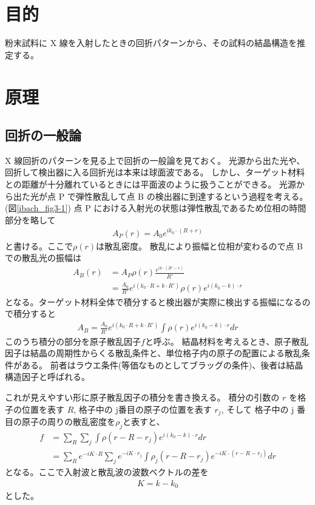 \documentclass[11pt,dvipdfmx,a4paper]{jsarticle}
\begin{document}
\section{目的}
粉末試料に X 線を入射したときの回折パターンから、その試料の結晶構造を推定する。

\section{原理}
\subsection{回折の一般論}
X 線回折のパターンを見る上で回折の一般論を見ておく。
光源から出た光や、回折して検出器に入る回折光は本来は球面波である。
しかし、ターゲット材料との距離が十分離れているときには平面波のように扱うことができる。
光源から出た光が点 P で弾性散乱して点 B の検出器に到達するという過程を考える。(図\ref{ibach_fig3-1})
点 P における入射光の状態は弾性散乱であるため位相の時間部分を略して
\begin{align}
	A_P(r) = A_0e^{ik_0\cdot(R+r)}
\end{align}
と書ける。ここで\(\rho(r)\)は散乱密度。
散乱により振幅と位相が変わるので点 B での散乱光の振幅は
\begin{align}
	A_B(r) &= A_P \rho(r) \frac{e^{ik\cdot(R'-r)}}{R'}\\
	&=\frac{A_0}{R'}e^{i(k_0 \cdot R+ k \cdot R')}\rho(r)e^{i(k_0-k)\cdot r}
\end{align}
となる。ターゲット材料全体で積分すると検出器が実際に検出する振幅になるので積分すると
\begin{align}
	A_B =\frac{A_0}{R'}e^{i(k_0 \cdot R+ k \cdot R')}\int \rho(r) e^{i(k_0-k)\cdot r} dr
\end{align}
このうち積分の部分を原子散乱因子\(f\)と呼ぶ。
結晶材料を考えるとき、原子散乱因子は結晶の周期性からくる散乱条件と、単位格子内の原子の配置による散乱条件がある。
前者はラウエ条件(等価なものとしてブラッグの条件)、後者は結晶構造因子と呼ばれる。

これが見えやすい形に原子散乱因子の積分を書き換える。
積分の引数の \(r\) を格子の位置を表す \(R\), 格子中の j番目の原子の位置を表す \(r_j\), そして
格子中の j 番目の原子の周りの散乱密度を\(\rho_j\)と表すと、
\begin{align}
	f&=\sum_R \sum_{j} \int\rho(r-R-r_j)e^{i(k_0-k)\cdot r} dr\\
	&=\sum_R e^{-iK\cdot R}\sum_j e^{-iK\cdot r_j} \int \rho_j(r-R-r_j) e^{-iK\cdot(r-R-r_j)}dr\label{factor_1}
\end{align}
となる。ここで入射波と散乱波の波数ベクトルの差を
\begin{align}
	K = k -k_0
\end{align}
とした。
\end{document}
